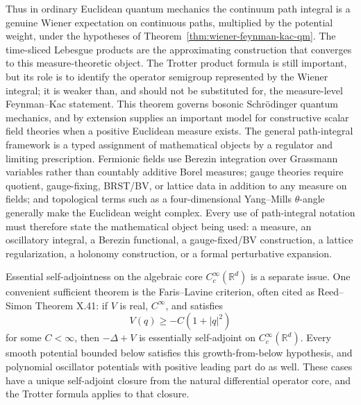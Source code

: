 Thus in ordinary Euclidean quantum mechanics the continuum path integral is a
genuine Wiener expectation on continuous paths, multiplied by the potential
weight, under the hypotheses of
Theorem~\ref{thm:wiener-feynman-kac-qm}.  The time-sliced Lebesgue products
are the approximating construction that converges to this measure-theoretic
object.
The Trotter product formula is still important, but its role is to identify
the operator semigroup represented by the Wiener integral; it is weaker than,
and should not be substituted for, the measure-level Feynman--Kac statement.
This theorem governs bosonic Schr\"odinger quantum mechanics, and by extension
supplies an important model for constructive scalar field theories when a
positive Euclidean measure exists.  The general path-integral framework is a
typed assignment of mathematical objects by a regulator and limiting
prescription.  Fermionic fields use Berezin integration over Grassmann
variables rather than countably additive Borel measures; gauge theories require
quotient, gauge-fixing, BRST/BV, or lattice data in addition to any measure on
fields; and topological terms such as a four-dimensional Yang--Mills
\(\theta\)-angle generally make the Euclidean weight complex.  Every use of
path-integral notation must therefore state the mathematical object being
used: a measure, an oscillatory integral, a Berezin functional, a
gauge-fixed/BV construction, a lattice regularization, a holonomy
construction, or a formal perturbative expansion.

\begin{theorem}
\label{qthm:faris-lavine-essential-self-adjointness}
Essential self-adjointness on the algebraic core \(C_c^\infty(\mathbb R^d)\)
is a separate issue.  One convenient sufficient theorem is the Faris--Lavine
criterion, often cited as Reed--Simon Theorem X.41: if \(V\) is real,
\(C^\infty\), and satisfies
\[
  V(q)\ge -C(1+|q|^2)
\]
for some \(C<\infty\), then
\(-\Delta+V\) is essentially self-adjoint on \(C_c^\infty(\mathbb R^d)\).
Every smooth potential bounded below satisfies this growth-from-below
hypothesis, and polynomial oscillator potentials with positive leading part do
as well.  These cases have a unique self-adjoint closure from the natural
differential operator core, and the Trotter formula applies to that closure.
\end{theorem}

